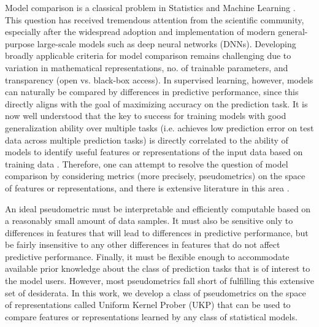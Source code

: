 \documentclass{article} %
\theoremstyle{plain}
\begin{document}
Model comparison is a classical problem in Statistics and Machine Learning \citep{burnham1998practical,pfahringer2000meta,spiegelhalter2002bayesian,caruana2006empirical,fernandez2014we}. This question has received tremendous attention from the scientific community, especially after the widespread adoption and implementation of modern general-purpose large-scale models such as deep neural networks (DNNs). Developing broadly applicable criteria for model comparison remains challenging due to variation in mathematical representations, no. of trainable parameters, and transparency (open vs. black-box access). In supervised learning, however, models can naturally be compared by differences in predictive performance, since this directly aligns with the goal of maximizing accuracy on the prediction task. It is now well understood that the key to success for training models with good generalization ability over multiple tasks (i.e. achieves low prediction error on test data across multiple prediction tasks) is directly correlated to the ability of models to identify useful features or representations of the input data based on training data \citep{bengio2013representation,lecun2015deep,maurer2016benefit}. Therefore, one can attempt to resolve the question of model comparison by considering metrics (more precisely, pseudometrics) on the space of features or representations, and there is extensive literature in this area \citep{laakso2000content,li2015convergent,morcos2018insights,wang2018towards,kornblith2019similarity,GULP}.

  An ideal pseudometric must be interpretable and efficiently computable based on a reasonably small amount of data samples. It must also be sensitive only to differences in features that will lead to differences in predictive performance, but be fairly insensitive to any other differences in features that do not affect predictive performance. Finally, it must be flexible enough to accommodate available prior knowledge about the class of prediction tasks that is of interest to the model users. However, most pseudometrics fall short of fulfilling this extensive set of desiderata. In this work, we develop a class of pseudometrics on the space of representations called Uniform Kernel Prober (UKP) that can be used to compare features or representations learned by any class of statistical models. 
\end{document}
